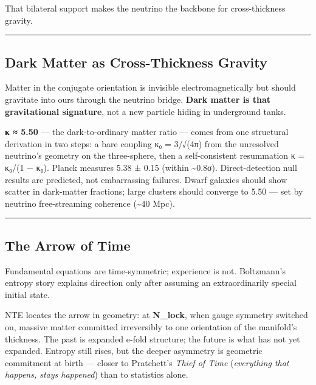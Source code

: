\documentclass[
  11pt,
]{article}
\begin{document}
That bilateral support makes the neutrino the backbone for
cross-thickness gravity.

\begin{center}\rule{0.5\linewidth}{0.5pt}\end{center}

\subsection{Dark Matter as Cross-Thickness
Gravity}\label{dark-matter-as-cross-thickness-gravity}

Matter in the conjugate orientation is invisible electromagnetically but
should gravitate into ours through the neutrino bridge. \textbf{Dark
matter is that gravitational signature}, not a new particle hiding in
underground tanks.

\textbf{κ ≈ 5.50} --- the dark-to-ordinary matter ratio --- comes from
one structural derivation in two steps: a bare coupling κ₀ = 3/√(4π)
from the unresolved neutrino's geometry on the three-sphere, then a
self-consistent resummation κ = κ₀/(1 − κ₀). Planck measures 5.38 ± 0.15
(within \textasciitilde0.8σ). Direct-detection null results are
predicted, not embarrassing failures. Dwarf galaxies should show scatter
in dark-matter fractions; large clusters should converge to 5.50 --- set
by neutrino free-streaming coherence (\textasciitilde40 Mpc).

\begin{center}\rule{0.5\linewidth}{0.5pt}\end{center}

\subsection{The Arrow of Time}\label{the-arrow-of-time}

Fundamental equations are time-symmetric; experience is not. Boltzmann's
entropy story explains direction only after assuming an extraordinarily
special initial state.

NTE locates the arrow in geometry: at \textbf{N\_lock}, when gauge
symmetry switched on, massive matter committed irreversibly to one
orientation of the manifold's thickness. The past is expanded e-fold
structure; the future is what has not yet expanded. Entropy still rises,
but the deeper asymmetry is geometric commitment at birth --- closer to
Pratchett's \emph{Thief of Time} (\emph{everything that happens, stays
happened}) than to statistics alone.
\end{document}
